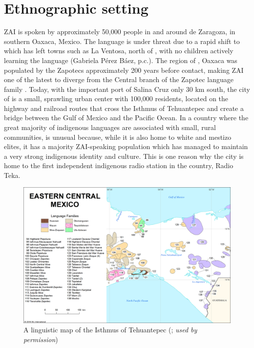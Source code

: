 \section{Ethnographic setting}

ZAI is spoken by approximately 50,000 people in and around  de Zaragoza, in southern Oaxaca, Mexico. The language is under threat due to a rapid shift to  which has left towns such as La Ventosa, north of , with no children actively learning the language (Gabriela P\'{e}rez B\'{a}ez, p.c.). The region of , Oaxaca was populated by the Zapotecs approximately 200 years before  contact, making ZAI one of the latest to diverge from the Central branch of the Zapotec language family \citep{rendon1995}. Today, with the important port of Salina Cruz only 30 km south, the city of  is a small, sprawling urban center with 100,000 residents, located on the highway and railroad routes that cross the Isthmus of Tehuantepec and create a bridge between the Gulf of Mexico and the Pacific Ocean. In a country where the great majority of indigenous languages are associated with small, rural communities,  is unusual because, while it is also home to white and mestizo elites, it has a majority ZAI-speaking population which has managed to maintain a very strong indigenous identity and culture. This is one reason why the city is home to the first independent indigenous radio station in the country, Radio Teka. 



\begin{figure}
\includegraphics[height=.4\textheight]{mapa3.png}
\caption{\small{A linguistic map of the Isthmus of Tehuantepec (\cite{lewis2016}; \textit{used by permission})}}
\end{figure}


